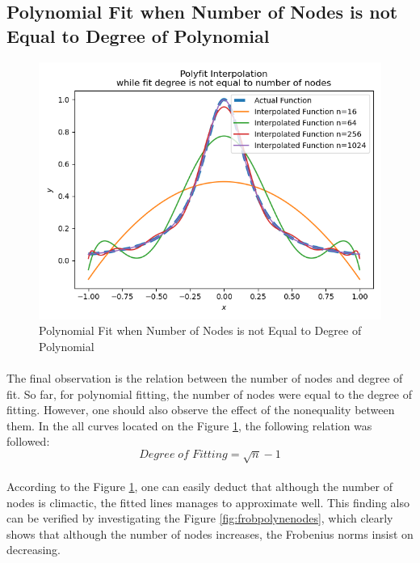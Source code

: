 \documentclass[letterpaper,12pt]{article}
\begin{document}
\subsection{Polynomial Fit when Number of Nodes is not Equal to Degree of Polynomial}

    
\begin{figure}[H]
    \centerline{\includegraphics[width=\linewidth]{figures/polynenodes.png}}
    \caption{Polynomial Fit when Number of Nodes is not Equal to Degree of Polynomial}
    \label{fig:polynenodes}
    \end{figure}
     
\paragraph{} The final observation is the relation between the number of nodes and degree of fit. So far, for polynomial fitting, the number of nodes were equal to the degree of fitting. However, one should also observe the effect of the nonequality between them. In the all curves located on the Figure \ref{fig:polynenodes}, the following relation was followed:
\begin{equation*}
    Degree \; of \; Fitting = \sqrt{n} - 1
\end{equation*}

\paragraph{} According to the Figure \ref{fig:polynenodes}, one can easily deduct that although the number of nodes is climactic, the fitted lines manages to approximate well. This finding also can be verified by investigating the Figure \ref{fig:frobpolynenodes}, which clearly shows that although the number of nodes increases, the Frobenius norms insist on decreasing.
    
\end{document}
